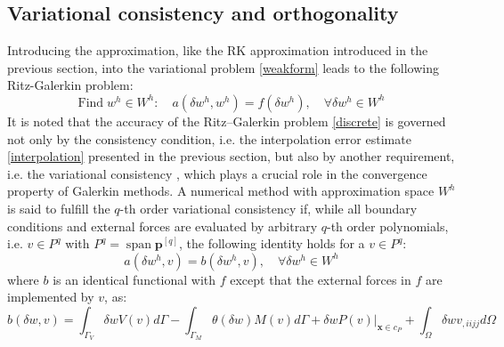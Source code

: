 \subsection{Variational consistency and orthogonality}\label{sec:gauss}

Introducing the approximation, like the RK approximation introduced in the previous section, into the variational problem \eqref{weakform} leads to the following Ritz-Galerkin problem:
\begin{equation}\label{discrete}
	\textrm{Find}\; w^h \in W^h: \quad a(\delta w^h, w^h) = f(\delta w^h), \quad \forall \delta w^h \in W^h
\end{equation}
It is noted that the accuracy of the Ritz--Galerkin problem \eqref{discrete} is governed not only by the consistency condition, i.e. the interpolation error estimate \eqref{interpolation} presented in the previous section, but also by another requirement, i.e. the variational consistency \cite{}, which plays a crucial role in the convergence property of Galerkin methods.
A numerical method with approximation space $W^h$ is said to fulfill the $q$-th order variational consistency \cite{} if, while all boundary conditions and external forces are evaluated by arbitrary $q$-th order polynomials, i.e. $v \in P^q$ with $P^q = \operatorname{span}\boldsymbol p^{[q]}$, the following identity holds for a $v \in P^q$:
\begin{equation}\label{variational_consistency}
	a(\delta w^h, v) = b(\delta w^h, v),\quad \forall \delta w^h \in W^h
\end{equation}
where $b$ is an identical functional with $f$ except that the external forces in $f$ are implemented by $v$, as:
\begin{equation}\label{functional_b}
	b(\delta w, v) =
	\int_{\Gamma_{V}} \delta w V(v) d\Gamma
	- \int_{\Gamma_{M}} \theta(\delta w) M(v) d\Gamma
	+ \delta w P(v)\vert_{\boldsymbol x \in c_P}
	+ \int_\Omega \delta w v_{,iijj} d\Omega
\end{equation}

